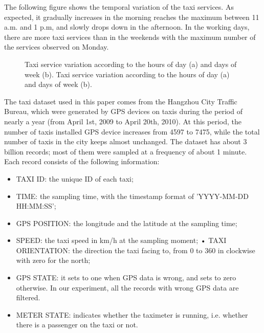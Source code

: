 \documentclass[a4paper, 10pt, conference]{ieeeconf}      %
\begin{document}
The following figure shows the temporal variation of the taxi services. As expected, it gradually increases in the morning reaches the maximum between 11 a.m. and 1 p.m, and slowly drops down in the afternoon. In the working days, there are more taxi services than in the weekends with the maximum number of the services observed on Monday. 

\begin{figure}[htbp]
    \centering

    \caption{ Taxi service variation according to the hours of day (a) and days of week (b). Taxi service variation according to the hours of day (a) and days of week (b).}
    \label{fig:my_png_2}
\end{figure}

The taxi dataset used in this paper comes from the Hangzhou City Traffic Bureau, which were generated by GPS devices on taxis during the period of nearly a year (from April 1st, 2009 to April 20th, 2010). At this period, the number of taxis installed GPS device increases from 4597 to 7475, while the total number of taxis in the city keeps almost unchanged. The dataset has about 3 billion records; most of them were sampled at a frequency of about 1 minute. Each record consists of the following information:

\begin{itemize}

\item TAXI ID: the unique ID of each taxi;
\item TIME: the sampling time, with the timestamp format of ’YYYY-MM-DD HH:MM:SS’;
\item GPS POSITION: the longitude and the latitude at the sampling time;
\item SPEED: the taxi speed in km/h at the sampling moment; • TAXI ORIENTATION: the direction the taxi facing to, from 0 to 360 in clockwise with zero for the north;
\item GPS STATE: it sets to one when GPS data is wrong, and sets to zero otherwise. In our experiment, all the records with wrong GPS data are filtered.
\item METER STATE: indicates whether the taximeter is running, i.e. whether there is a passenger on the taxi or not.

\end{itemize}
\end{document}
